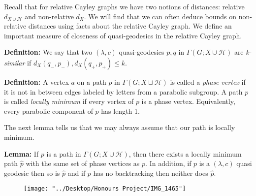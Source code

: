 \documentclass[12pt]{article}
\newcommand{\vs}{\vskip10pt}
\begin{document}
	\vs 
	
	Recall that for relative Cayley graphs we have two notions of distances: relative $d_{X \cup \mathcal{H}}$ and non-relative $d_X$. We will find that we can often deduce bounds on non-relative distances using facts about the relative Cayley graph. We define an important measure of closeness of quasi-geodesics in the relative Cayley graph. 
	
	\vs
	
	\textbf{Definition: } We say that two $(\lambda, c)$ quasi-geodesics $p, q$ in $\Gamma(G; X \cup \mathcal{H})$ are \textit{k-similar} if $d_X(q_{-}, p_{-}), d_X(q_{+}, p_{+}) \leq k$. 
	
	\vs 
	
	\textbf{Definition: } A vertex $a$ on a path $p$  in $\Gamma(G; X \sqcup \mathcal{H})$ is called a \textit{phase vertex} if it is not in between edges labeled by letters from a parabolic subgroup. A path $p$ is called \textit{locally minimum} if every vertex of $p$ is a phase vertex. Equivalently, every parabolic component of $p$ has length 1. 
	
	\vs 
	
	The next lemma tells us that we may always assume that our path is locally minimum. 
	
	\vs 
	
	\textbf{Lemma: } If $p$ is a path in $\Gamma(G;X \cup \mathcal{H})$, then there exists a locally minimum path $\hat{p}$ with the same set of phase vertices as $p$. In addition, if $p$ is a $(\lambda, c)$ quasi geodesic then so is $\hat{p}$ and if $p$ has no backtracking then neither does $\hat{p}$.
	
\begin{figure} [h]
	\centering
	\texttt{[image: "../Desktop/Honours Project/IMG\_1465"]}
	\caption{}
	\label{fig:img1465}
\end{figure}
	
\end{document}
